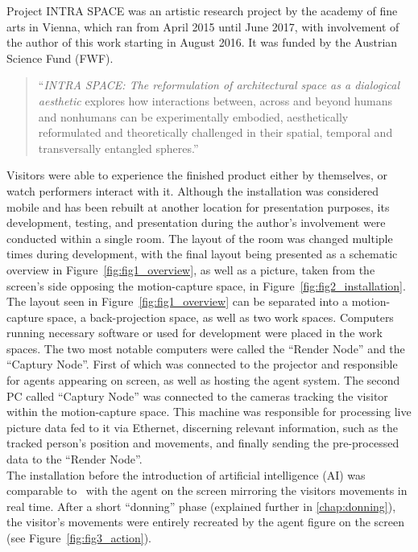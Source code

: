\documentclass[draft,final]{vutinfth} %
\begin{document}
Project INTRA SPACE was an artistic research project by the academy of fine arts in Vienna, which ran from April 2015 until June 2017, with involvement of the author of this work starting in August 2016. 
It was funded by the Austrian Science Fund (FWF).
\begin{quote}
	``\emph{INTRA SPACE: The reformulation of architectural space as a dialogical aesthetic} explores how interactions between, across and beyond humans and nonhumans can be experimentally embodied, aesthetically reformulated and theoretically challenged in their spatial, temporal and transversally entangled spheres.''~\cite{intraspaceAbout}
\end{quote}
Visitors were able to experience the finished product either by themselves, or watch performers interact with it. 
Although the installation was considered mobile and has been rebuilt at another location for presentation purposes, its development, testing, and presentation during the author’s involvement were conducted within a single room. 
The layout of the room was changed multiple times during development, with the final layout being presented as a schematic overview in Figure~\ref{fig:fig1_overview}, as well as a picture, taken from the screen’s side opposing the motion-capture space, in Figure~\ref{fig:fig2_installation}. \\
The layout seen in Figure~\ref{fig:fig1_overview} can be separated into a motion-capture space, a back-projection space, as well as two work spaces. 
Computers running necessary software or used for development were placed in the work spaces. 
The two most notable computers were called the “Render Node” and the “Captury Node”. 
First of which was connected to the projector and responsible for agents appearing on screen, as well as hosting the agent system. 
The second PC called “Captury Node” was connected to the cameras tracking the visitor within the motion-capture space.
This machine was responsible for processing live picture data fed to it via Ethernet, discerning relevant information, such as the tracked person’s position and movements, and finally sending the pre-processed data to the “Render Node”. \\
The installation before the introduction of artificial intelligence (AI) was comparable to~\cite{10.1007/978-3-319-09767-1_7} with the agent on the screen mirroring the visitors movements in real time. 
After a short “donning” phase (explained further in \autoref{chap:donning}), the visitor’s movements were entirely recreated by the agent figure on the screen (see Figure~\ref{fig:fig3_action}). 
\end{document}
